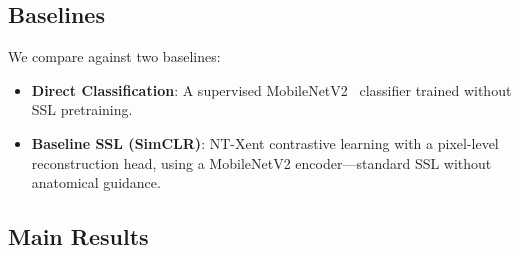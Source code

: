\subsection{Baselines}

We compare against two baselines:
\begin{itemize}
    \item \textbf{Direct Classification}: A supervised MobileNetV2~\cite{sandler2018mobilenetv2} classifier trained without SSL pretraining.
    \item \textbf{Baseline SSL (SimCLR)}: NT-Xent contrastive learning with a pixel-level reconstruction head, using a MobileNetV2 encoder---standard SSL without anatomical guidance.
\end{itemize}

\subsection{Main Results}

\begin{table}[t]
\centering
\caption{Per-Disease AUC-ROC (\%) on the NIH ChestX-ray14 Test Set}
\label{tab:results}
\end{table}

